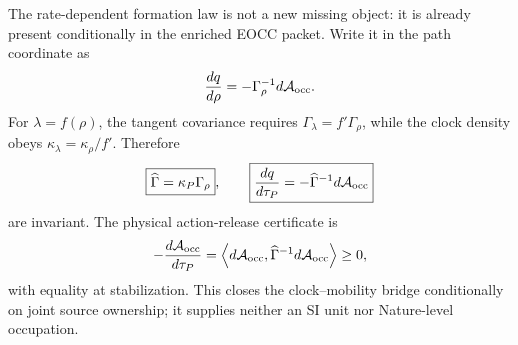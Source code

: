 \documentclass[11pt]{article}
\begin{document}
The rate-dependent formation law is not a new missing object: it is already
present conditionally in the enriched EOCC packet.  Write it in the path
coordinate as
\begin{equation}
 \frac{dq}{d\rho}=-\Gamma_\rho^{-1}d\mathcal A_{\rm occ}.
 \label{eq:synthesis-coordinate-eocc}
\end{equation}
For \(\lambda=f(\rho)\), the tangent covariance requires
\(\Gamma_\lambda=f'\Gamma_\rho\), while the clock density obeys
\(\kappa_\lambda=\kappa_\rho/f'\).  Therefore
\begin{equation}
 \boxed{\widehat\Gamma=\kappa_P\Gamma_\rho},
 \qquad
 \boxed{\frac{dq}{d\tau_P}
 =-\widehat\Gamma^{-1}d\mathcal A_{\rm occ}}
 \label{eq:synthesis-calibrated-eocc}
\end{equation}
are invariant.  The physical action-release certificate is
\begin{equation}
 -\frac{d\mathcal A_{\rm occ}}{d\tau_P}
 =\left\langle d\mathcal A_{\rm occ},
 \widehat\Gamma^{-1}d\mathcal A_{\rm occ}\right\rangle\geq0,
 \label{eq:synthesis-calibrated-release}
\end{equation}
with equality at stabilization.  This closes the clock--mobility bridge
conditionally on joint source ownership; it supplies neither an SI unit nor
Nature-level occupation.
\end{document}
